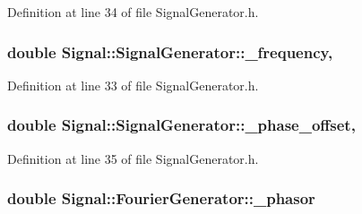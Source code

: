 Definition at line 34 of file Signal\+Generator.\+h.

\hypertarget{classSignal_1_1SignalGenerator_a7f107461333bce68c5dad412db96a8c2}{
\subsubsection[{\+\_\+frequency}]{\setlength{\rightskip}{0pt plus 5cm}double Signal\+::\+Signal\+Generator\+::\+\_\+frequency\hspace{0.3cm}{\ttfamily [protected]}, {\ttfamily [inherited]}}}\label{classSignal_1_1SignalGenerator_a7f107461333bce68c5dad412db96a8c2}


Definition at line 33 of file Signal\+Generator.\+h.

\hypertarget{classSignal_1_1SignalGenerator_a6b4444d46747c8517171edbbf4b5588f}{
\subsubsection[{\+\_\+phase\+\_\+offset}]{\setlength{\rightskip}{0pt plus 5cm}double Signal\+::\+Signal\+Generator\+::\+\_\+phase\+\_\+offset\hspace{0.3cm}{\ttfamily [protected]}, {\ttfamily [inherited]}}}\label{classSignal_1_1SignalGenerator_a6b4444d46747c8517171edbbf4b5588f}


Definition at line 35 of file Signal\+Generator.\+h.

\hypertarget{classSignal_1_1FourierGenerator_a72d24f45a30cd143508ce7eb753f4436}{
\subsubsection[{\+\_\+phasor}]{\setlength{\rightskip}{0pt plus 5cm}double Signal\+::\+Fourier\+Generator\+::\+\_\+phasor\hspace{0.3cm}{\ttfamily [protected]}}}\label{classSignal_1_1FourierGenerator_a72d24f45a30cd143508ce7eb753f4436}


